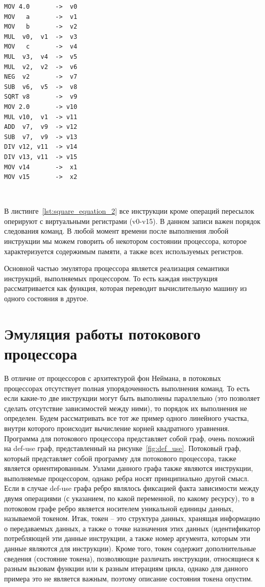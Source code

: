 \documentclass[
11pt,%
tightenlines,%
twoside,%
onecolumn,%
nofloats,%
nobibnotes,%
nofootinbib,%
superscriptaddress,%
noshowpacs,%
centertags]%
{revtex4}
\begin{document}
\begin{lstlisting}[caption={Псевдокод вычисления корней квадратного уравнения.},label={lst:square_equation_2}]
MOV 4.0       ->  v0
MOV   a       ->  v1
MOV   b       ->  v2
MUL  v0,  v1  ->  v3
MOV   c       ->  v4
MUL  v3,  v4  ->  v5
MUL  v2,  v2  ->  v6
NEG  v2       ->  v7
SUB  v6,  v5  ->  v8
SQRT v8       ->  v9
MOV 2.0       -> v10
MUL v10,  v1  -> v11
ADD  v7,  v9  -> v12
SUB  v7,  v9  -> v13
DIV v12, v11  -> v14
DIV v13, v11  -> v15
MOV v14       ->  x1
MOV v15       ->  x2
\end{lstlisting}

\

В листинге~\ref{lst:square_equation_2} все инструкции кроме операций пересылок оперируют с виртуальными регистрами (v0-v15).
В данном записи важен порядок следования команд.
В любой момент времени после выполнения любой инструкции мы можем говорить об некотором состоянии процессора, которое характеризуется содержимым памяти, а также всех используемых регистров.

Основной частью эмулятора процессора является реализация семантики инструкций, выполняемых процессором.
То есть каждая инструкция рассматривается как функция, которая переводит вычислительную машину из одного состояния в другое.

\section{Эмуляция работы потокового процессора}

В отличие от процессоров с архитектурой фон Неймана, в потоковых процессорах отсутствует полная упорядоченность выполнения команд.
То есть если какие-то две инструкции могут быть выполнены параллельно (это позволяет сделать отсутствие зависимостей между ними), то порядок их выполнения не определен.
Будем рассматривать все тот же пример одного линейного участка, внутри которого происходит вычисление корней квадратного уравнения.
Программа для потокового процессора представляет собой граф, очень похожий на def-use граф, представленный на рисунке~\ref{fig:def_use}.
Потоковый граф, который представляет собой программу для потокового процессора, также является ориентированным.
Узлами данного графа также являются инструкции, выполняемые процессором, однако ребра носят принципиально другой смысл.
Если в случае def-use графа ребро являлось фиксацией факта зависимости между двумя операциями (с указанием, по какой переменной, по какому ресурсу), то в потоковом графе ребро является носителем уникальной единицы данных, называемой токеном.
Итак, токен -- это структура данных, хранящая информацию о передаваемых данных, а также о точке назначения этих данных (идентификатор потребляющей эти данные инструкции, а также номер аргумента, которым эти данные являются для инструкции).
Кроме того, токен содержит дополнительные сведения (состояние токена), позволяющие различать инструкции, относящиеся к разным вызовам функции или к разным итерациям цикла, однако для данного примера это не является важным, поэтому описание состояния токена опустим.
\end{document}
